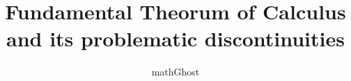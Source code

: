 \documentclass{scrbook}
\title{Fundamental Theorum of Calculus and its problematic discontinuities}
\author{mathGhost}
\begin{document}
	\maketitle
	\tableofcontents
	
	
	
	\begin{appendices}
		
	\end{appendices}
\end{document}

